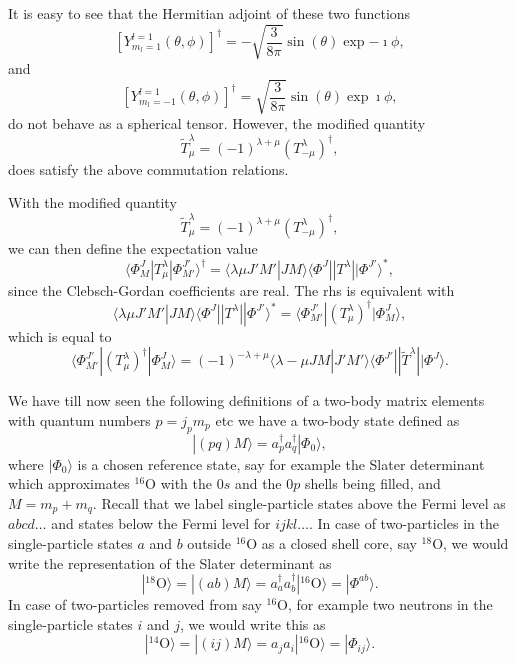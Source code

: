 \documentclass[graybox,sectrefs,envcountresetchap,open=right]{svmonodo}
\begin{document}
It is easy to see that the Hermitian adjoint of these two functions
\[
\left[Y^{l=1}_{m_l=1}(\theta,\phi)\right]^{\dagger}=-\sqrt{\frac{3}{8\pi}}\sin{(\theta)}\exp{-\imath\phi},
\]
and 
\[
\left[Y^{l=1}_{m_l=-1}(\theta,\phi)\right]^{\dagger}=\sqrt{\frac{3}{8\pi}}\sin{(\theta)}\exp{\imath\phi},
\]
do not behave as a spherical tensor. However, the modified quantity 
\[
\tilde{T}^{\lambda}_{\mu}=(-1)^{\lambda+\mu}(T^{\lambda}_{-\mu})^{\dagger},
\]
does satisfy the above commutation relations.





With the modified quantity 
\[
\tilde{T}^{\lambda}_{\mu}=(-1)^{\lambda+\mu}(T^{\lambda}_{-\mu})^{\dagger},
\]
we can then define the expectation value
\[
\langle \Phi^J_M|T^{\lambda}_{\mu}|\Phi^{J'}_{M'}\rangle^{\dagger} = \langle \lambda \mu J'M'|JM\rangle\langle \Phi^J||T^{\lambda}||\Phi^{J'}\rangle^*,
\]
since the Clebsch-Gordan coefficients are real. The rhs is equivalent with 
\[
\langle \lambda \mu J'M'|JM\rangle\langle \Phi^J||T^{\lambda}||\Phi^{J'}\rangle^*=\langle \Phi^{J'}_{M'}|(T^{\lambda}_{\mu})^{\dagger}|\Phi^{J}_{M}\rangle,
\]
which is equal to 
\[
\langle \Phi^{J'}_{M'}|(T^{\lambda}_{\mu})^{\dagger}|\Phi^{J}_{M}\rangle=(-1)^{-\lambda+\mu}\langle \lambda -\mu JM|J'M'\rangle\langle \Phi^{J'}||\tilde{T}^{\lambda}||\Phi^{J}\rangle.
\]



We have till now seen the following definitions of a two-body matrix elements 
with quantum numbers $p=j_pm_p$ etc we have a two-body state defined as
\[
|(pq)M\rangle  = a^{\dagger}_pa^{\dagger}_q|\Phi_0\rangle,
\]
where $|\Phi_0\rangle$ is a chosen reference state, say for example the Slater determinant which approximates 
${}^{16}\mbox{O}$ with the $0s$ and the $0p$ shells being filled, and $M=m_p+m_q$. Recall that we label single-particle states above the Fermi level as $abcd\dots$ and states below the Fermi level for $ijkl\dots$.  
In case of two-particles in the single-particle states $a$ and $b$ outside ${}^{16}\mbox{O}$ as a closed shell core, say ${}^{18}\mbox{O}$, 
we would write the representation of the Slater determinant as
\[
|^{18}\mathrm{O}\rangle =|(ab)M\rangle  = a^{\dagger}_aa^{\dagger}_b|^{16}\mathrm{O}\rangle=|\Phi^{ab}\rangle.
\]
In case of two-particles removed from say ${}^{16}\mbox{O}$, for example two neutrons in the single-particle states $i$ and $j$, we would write this as
\[
|^{14}\mathrm{O}\rangle =|(ij)M\rangle  = a_ja_i|^{16}\mathrm{O}\rangle=|\Phi_{ij}\rangle.
\]
\end{document}
